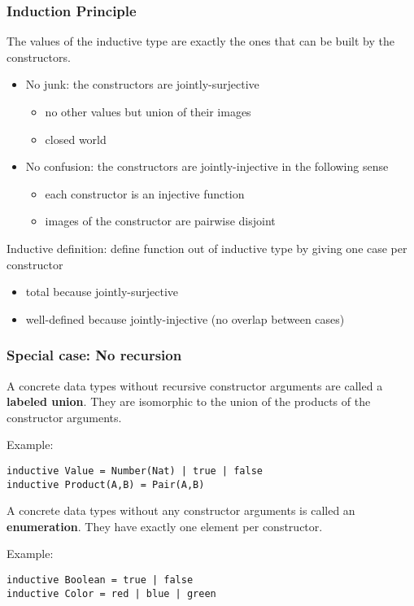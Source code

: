 \begin{frame}[fragile]\frametitle{Induction Principle}
The values of the inductive type are exactly the ones that can be built by the constructors.
\begin{itemize}
\item No junk: the constructors are jointly-surjective
 \begin{itemize}
 \item no other values but union of their images
 \item closed world
 \end{itemize}
\item No confusion: the constructors are jointly-injective in the following sense
 \begin{itemize}
  \item each constructor is an injective function
  \item images of the constructor are pairwise disjoint
 \end{itemize}
\end{itemize}

Inductive definition: define function out of inductive type by giving one case per constructor
\begin{itemize}
\item total because jointly-surjective
\item well-defined because jointly-injective (no overlap between cases)
\end{itemize}
\end{frame}

\begin{frame}[fragile]\frametitle{Special case: No recursion}
A concrete data types without recursive constructor arguments are called a \textbf{labeled union}.
They are isomorphic to the union of the products of the constructor arguments.

Example:
\begin{lstlisting}
inductive Value = Number(Nat) | true | false
inductive Product(A,B) = Pair(A,B)
\end{lstlisting}

A concrete data types without any constructor arguments is called an \textbf{enumeration}.
They have exactly one element per constructor.

Example:
\begin{lstlisting}
inductive Boolean = true | false
inductive Color = red | blue | green
\end{lstlisting}
\end{frame}

